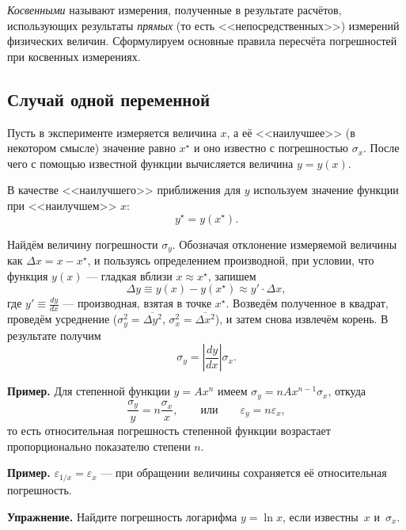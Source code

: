 \documentclass[10pt]{article}
\begin{document}
\emph{Косвенными} называют измерения, полученные в результате расчётов,
использующих результаты \emph{прямых} (то есть <<непосредственных>>)
измерений физических величин. Сформулируем основные правила пересчёта
погрешностей при косвенных измерениях.

\subsection{Случай одной переменной}

Пусть в эксперименте измеряется величина $x$, а её <<наилучшее>>
(в некотором смысле) значение равно $x^{\star}$ и оно известно с
погрешностью $\sigma_{x}$. После чего с помощью известной функции
вычисляется величина $y=y\!\left(x\right)$.

В качестве <<наилучшего>> приближения для
$y$ используем значение функции при <<наилучшем>>
$x$:
\[
y^{\star}=y\!\left(x^{\star}\right).
\]

Найдём величину погрешности $\sigma_{y}$. Обозначая отклонение измеряемой
величины как $\Delta x=x-x^{\star}$, и пользуясь определением производной,
при условии, что функция $y\left(x\right)$ --- гладкая
вблизи $x\approx x^{\star}$, запишем 
\[
\Delta y\equiv y\left(x\right)-y\left(x^{\star}\right)\approx y'\cdot\Delta x,
\]
где $y'\equiv\frac{dy}{dx}$ --- производная, взятая в точке
$x^{\star}$. Возведём полученное в квадрат, проведём усреднение ($\sigma_{y}^{2}=\overline{\Delta y^{2}}$,
$\sigma_{x}^{2}=\overline{\Delta x^{2}}$), и затем снова извлечём
корень. В результате получим
\begin{equation}
\boxed{{\sigma_{y}=\left|\frac{dy}{dx}\right|\sigma_{x}.}}\label{eq:sxy}
\end{equation}

\textbf{\footnotesize{}Пример.}{\footnotesize{} Для степенной функции
$y=Ax^{n}$ имеем $\sigma_{y}=nAx^{n-1}\sigma_{x}$, откуда 
\[
\frac{\sigma_{y}}{y}=n\frac{\sigma_{x}}{x},\qquad\text{или}\qquad\varepsilon_{y}=n\varepsilon_{x},
\]
то есть относительная погрешность степенной функции возрастает пропорционально
показателю степени $n$.}{\footnotesize\par}

\textbf{\footnotesize{}Пример.}{\footnotesize{} $\varepsilon_{1/x}=\varepsilon_{x}$
--- при обращении величины сохраняется её относительная
погрешность.}{\footnotesize\par}

\textbf{\footnotesize{}Упражнение. }{\footnotesize{}Найдите погрешность
логарифма $y=\ln x$, если известны~$x$ и~$\sigma_{x}$.}{\footnotesize\par}
\end{document}
